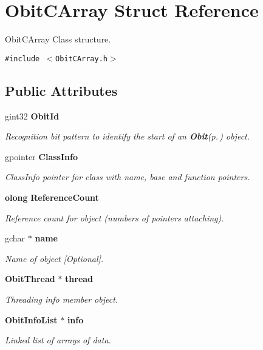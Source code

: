 \section{Obit\-CArray Struct Reference}
\label{structObitCArray}
Obit\-CArray Class structure.  


{\tt \#include $<$Obit\-CArray.h$>$}

\subsection*{Public Attributes}
\begin{CompactItemize}
\item 
gint32 {\bf Obit\-Id}
\begin{CompactList}\small\item\em Recognition bit pattern to identify the start of an {\bf Obit}{\rm (p.\,\pageref{structObit})} object. \item\end{CompactList}\item 
gpointer {\bf Class\-Info}
\begin{CompactList}\small\item\em Class\-Info pointer for class with name, base and function pointers. \item\end{CompactList}\item 
{\bf olong} {\bf Reference\-Count}
\begin{CompactList}\small\item\em Reference count for object (numbers of pointers attaching). \item\end{CompactList}\item 
gchar $\ast$ {\bf name}
\begin{CompactList}\small\item\em Name of object [Optional]. \item\end{CompactList}\item 
{\bf Obit\-Thread} $\ast$ {\bf thread}
\begin{CompactList}\small\item\em Threading info member object. \item\end{CompactList}\item 
{\bf Obit\-Info\-List} $\ast$ {\bf info}
\begin{CompactList}\small\item\em Linked list of arrays of data. \item\end{CompactList}\item 

\end{CompactItemize}
